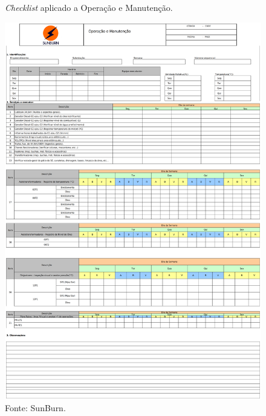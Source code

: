   
  \begin{figure}[H]
    \caption{\textit{Checklist} aplicado a Operação e Manutenção.} %
    \includegraphics[width=1\textwidth]{images/checklist_aplicacao.png}
    \caption*{Fonte: SunBurn.}
    \label{fig:checklist_aplicacao}
  \end{figure}
  